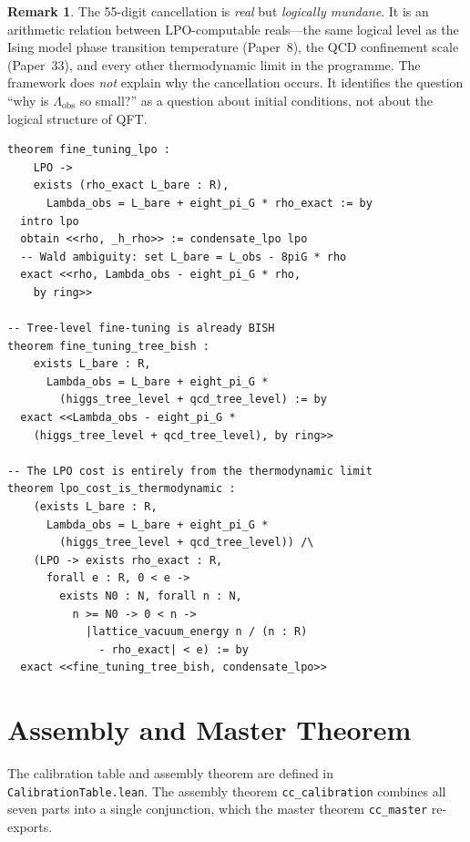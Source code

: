 \documentclass[11pt,a4paper]{article}
\theoremstyle{plain}
\theoremstyle{definition}
\newtheorem{remark}[theorem]{Remark}
\newcommand{\LPO}{\ensuremath{\mathrm{LPO}}}
\newcommand{\Lobs}{\Lambda_{\mathrm{obs}}}
\begin{document}
\begin{remark}
The 55-digit cancellation is \emph{real} but \emph{logically mundane}.
It is an arithmetic relation between $\LPO$-computable reals---the
same logical level as the Ising model phase transition temperature
(Paper~8), the QCD confinement scale (Paper~33), and every other
thermodynamic limit in the programme.  The framework does \emph{not}
explain why the cancellation occurs.  It identifies the question
``why is $\Lobs$ so small?'' as a question about initial conditions,
not about the logical structure of QFT.
\end{remark}

\begin{lstlisting}[caption={Fine-tuning: \texttt{FineTuningLPO.lean}}]
theorem fine_tuning_lpo :
    LPO ->
    exists (rho_exact L_bare : R),
      Lambda_obs = L_bare + eight_pi_G * rho_exact := by
  intro lpo
  obtain <<rho, _h_rho>> := condensate_lpo lpo
  -- Wald ambiguity: set L_bare = L_obs - 8piG * rho
  exact <<rho, Lambda_obs - eight_pi_G * rho,
    by ring>>

-- Tree-level fine-tuning is already BISH
theorem fine_tuning_tree_bish :
    exists L_bare : R,
      Lambda_obs = L_bare + eight_pi_G *
        (higgs_tree_level + qcd_tree_level) := by
  exact <<Lambda_obs - eight_pi_G *
    (higgs_tree_level + qcd_tree_level), by ring>>

-- The LPO cost is entirely from the thermodynamic limit
theorem lpo_cost_is_thermodynamic :
    (exists L_bare : R,
      Lambda_obs = L_bare + eight_pi_G *
        (higgs_tree_level + qcd_tree_level)) /\
    (LPO -> exists rho_exact : R,
      forall e : R, 0 < e ->
        exists N0 : N, forall n : N,
          n >= N0 -> 0 < n ->
            |lattice_vacuum_energy n / (n : R)
              - rho_exact| < e) := by
  exact <<fine_tuning_tree_bish, condensate_lpo>>
\end{lstlisting}

\section{Assembly and Master Theorem}\label{sec:assembly}

The calibration table and assembly theorem are defined in
\texttt{CalibrationTable.lean}.  The assembly theorem
\texttt{cc\_calibration} combines all seven parts into a single
conjunction, which the master theorem \texttt{cc\_master} re-exports.
\end{document}
